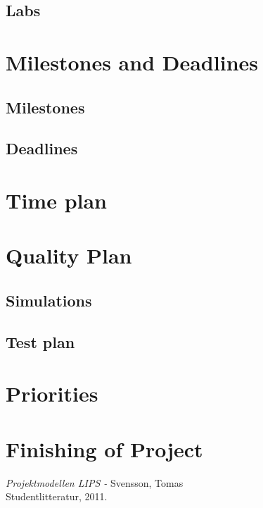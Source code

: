 \documentclass[a4paper,12pt]{article}
\begin{document}
\subsection{Labs}

\section{Milestones and Deadlines}
\subsection{Milestones}
\subsection{Deadlines}

\section{Time plan}

\section{Quality Plan}
\subsection{Simulations}
\subsection{Test plan}

\section{Priorities}

\section{Finishing of Project}

\newpage
\appendix

\newpage


\begin{thebibliography}{99}
\textit{Projektmodellen LIPS - } Svensson, Tomas
\\Studentlitteratur, 2011.
\end{thebibliography}
\end{document}
